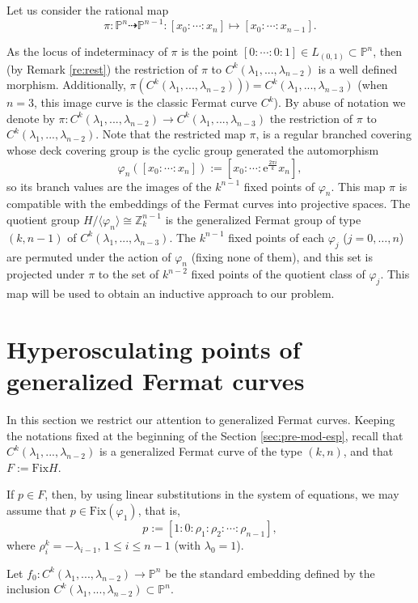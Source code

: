 \documentclass{amsart}
\newcommand{\C}[3]{\ensuremath{C^{#1}(#3_1,...,#3_{#2})}}
\begin{document}
Let us consider the rational  map  
$$\pi: {\mathbb{P}}^{n} \dashrightarrow {\mathbb{P}}^{n-1}: [x_0:\cdots:x_n] \mapsto [x_0:\cdots:x_{n-1}].$$ 


As the locus of indeterminacy of $\pi$ is the point
$[0:\cdots:0:1]\in L_{(0,1)} \subset {\mathbb{P}}^{n}$, then (by Remark \ref{re:rest}) the restriction of $\pi$ to $\C{k}{n-2}{\lambda}$
is a well defined morphism.  Additionally, $\pi(\C{k}{n-2}{\lambda}))=\C{k}{n-3}{\lambda}$ (when $n=3$, 
this image curve is the classic Fermat curve $C^k$).
By abuse of notation we  denote by $\pi: \C{k}{n-2}{\lambda} \to \C{k}{n-3}{\lambda}$ the restriction of
$\pi$ to $\C{k}{n-2}{\lambda}$. Note that the restricted map  $\pi$,  is a regular branched covering
whose deck covering group is the cyclic group generated the automorphism 
$$\varphi_n([x_0:\cdots:x_n]):=[x_0:\cdots :\mathrm{e}^{\frac{2\pi i}{k}}x_n],$$
so its  branch values  are the images of the $k^{n-1}$ fixed points of $\varphi_{n}$.
This map $\pi$ is compatible with the embeddings of the Fermat curves into projective spaces. 
The quotient group $H/\langle \varphi_{n}\rangle \cong {\mathbb Z}_{k}^{n-1}$ is the generalized Fermat
group of type $(k,n-1)$ of  $\C{k}{n-3}{\lambda}$. The $k^{n-1}$ fixed points of each 
$\varphi_{j}$ ($j=0,\ldots,n$) are permuted under the action of $\varphi_{n}$ (fixing none of them), and 
this set is projected under $\pi$ to the set of $k^{n-2}$ fixed points of the quotient class of $\varphi_{j}$. 
This map will be used to obtain an inductive approach to our problem.


\section{Hyperosculating points of generalized Fermat curves}
In this section we restrict our attention to generalized Fermat curves.
Keeping  the notations fixed at the beginning of the Section \ref{sec:pre-mod-esp}, recall that $\C{k}{n-2}{\lambda}$ is a generalized Fermat curve of the type $(k,n)$, and that  $F:={\mathrm{Fix}} H$.   
 
If $p \in F$, then, by using linear substitutions in the system of equations, we may assume that $p\in {\mathrm{Fix}}(\varphi_1)$, that is, 
$$p:=[1:0:\rho_1:\rho_2:\cdots:\rho_{n-1}],$$
where $\rho_i^{k}=-{\lambda}_{i-1}$, $1\leq i\leq n-1$ (with ${\lambda}_{0}=1$).

Let $f_0:\C{k}{n-2}{\lambda} \rightarrow {\mathbb{P}}^n$ be the standard embedding defined by the inclusion $\C{k}{n-2}{\lambda} \subset {\mathbb{P}}^n$.
\end{document}
